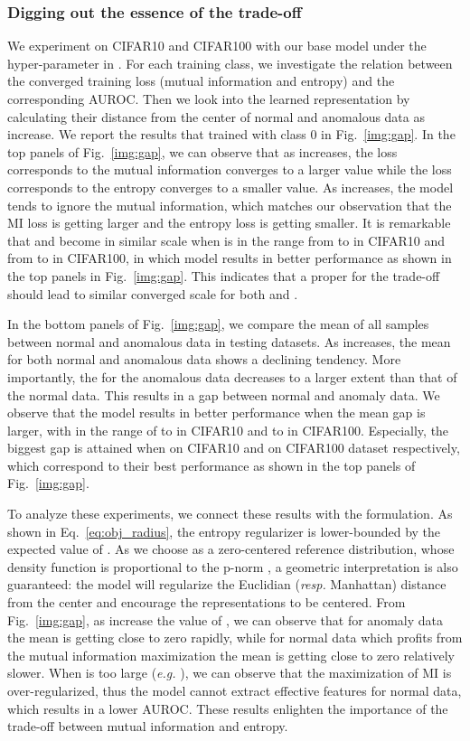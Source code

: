 \documentclass[journal]{IEEEtran}
\theoremstyle{remark}
\begin{document}
\subsubsection{\textbf{Digging out the essence of the trade-off}}\label{sec:trade-off}

We experiment on CIFAR10 and CIFAR100 with our base model under the hyper-parameter  in . 
For each training class, we investigate the relation between the converged training loss (mutual information and entropy) and the corresponding AUROC. Then we look into the learned representation  by calculating their distance from the center  of normal and anomalous data as  increase. We report the results that trained with class 0 in Fig.~\ref{img:gap}.
In the top panels of Fig.~\ref{img:gap}, we can observe that as  increases, the loss corresponds to the mutual information converges to a larger value while the loss corresponds to the entropy converges to a smaller value. As  increases, the model tends to ignore the mutual information, which matches our observation that the  MI loss is getting larger and the entropy loss is getting smaller. It is remarkable that  and  become in similar scale when  is in the range from  to  in CIFAR10 and from  to  in CIFAR100, in which model results in better performance as shown in the top panels in Fig.~\ref{img:gap}. 
This indicates that a proper  for the trade-off should lead to similar converged scale for both  and .

In the bottom panels of Fig.~\ref{img:gap}, we compare the mean  of all samples between normal and anomalous data in testing datasets.  As  increases, the mean  for both normal and anomalous data shows a declining tendency. More importantly, the  for the anomalous data decreases to a larger extent than that of the normal data. This results in a gap between normal and anomaly data.
We observe that the model results in better performance when the mean  gap is larger, with  in the range of  to  in CIFAR10 and  to  in CIFAR100. Especially, the biggest gap is attained when  on CIFAR10 and  on CIFAR100 dataset respectively, which correspond to their best performance as shown in the top panels of Fig.~\ref{img:gap}. 

To analyze these experiments, we connect these results with the formulation. As shown in Eq.~\ref{eq:obj_radius}, the entropy regularizer is lower-bounded by the expected value of . As we choose  as a zero-centered reference distribution, whose density function is proportional to the p-norm , a geometric interpretation is also guaranteed: the model will regularize the Euclidian (\textit{resp.} Manhattan) distance from the center  and encourage the representations  to be centered. From Fig.~\ref{img:gap}, as increase the value of , we can observe that for anomaly data the mean  is getting close to zero rapidly, while for normal data which profits from the mutual information maximization the mean  is getting close to zero relatively slower. When  is too large (\textit{e.g.} ), we can observe that the maximization of MI is over-regularized, thus the model cannot extract effective features for normal data, which results in a lower AUROC. These results enlighten the importance of the trade-off between mutual information and entropy. 
\end{document}
